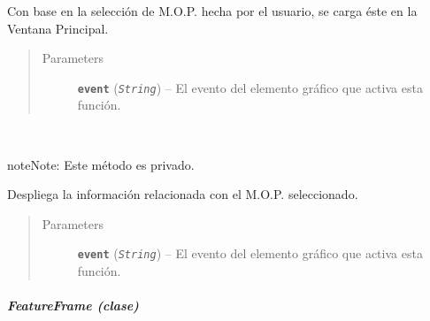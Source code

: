 \documentclass[letterpaper,10pt,english]{sphinxmanual}
\begin{document}
\begin{fulllineitems}
\begin{fulllineitems}
Con base en la selección de M.O.P.
hecha por el usuario, se carga éste
en la Ventana Principal.
\begin{quote}\begin{description}
\item[{Parameters}] \leavevmode
\textbf{\texttt{event}} (\emph{\texttt{String}}) -- El evento del elemento gráfico que
activa esta función.

\end{description}\end{quote}

\end{fulllineitems}


\begin{fulllineitems}
\label{View/Additional/MenuInternalOption/InternalOptionTab/MOPFrame:View.Additional.MenuInternalOption.InternalOptionTab.MOPFrame.MOPFrame._MOPFrame__update_current_mop}~
\begin{notice}{note}{Note:}
Este método es privado.
\end{notice}

Despliega la información relacionada con el
M.O.P. seleccionado.
\begin{quote}\begin{description}
\item[{Parameters}] \leavevmode
\textbf{\texttt{event}} (\emph{\texttt{String}}) -- El evento del elemento gráfico que
activa esta función.

\end{description}\end{quote}

\end{fulllineitems}


\end{fulllineitems}



\subparagraph{FeatureFrame (clase)}
\label{View/Additional/MenuInternalOption/InternalOptionTab/FeatureFrame:module-View.Additional.MenuInternalOption.InternalOptionTab.FeatureFrame}\label{View/Additional/MenuInternalOption/InternalOptionTab/FeatureFrame::doc}\label{View/Additional/MenuInternalOption/InternalOptionTab/FeatureFrame:featureframe-clase}
\end{document}
